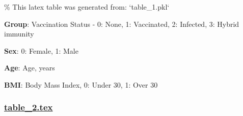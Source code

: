 \documentclass[11pt]{article}
\begin{document}
\begin{codeoutput}
\% This latex table was generated from: `table\_1.pkl`
\begin{table}[h]
\caption{Multiple regression analysis with the symptom number as the dependent variable}
\label{table:multiple\_regression}
\begin{threeparttable}
\renewcommand{\TPTminimum}{\linewidth}
\begin{tablenotes}
\footnotesize
\item \textbf{Group}: Vaccination Status - 0: None, 1: Vaccinated, 2: Infected, 3: Hybrid immunity
\item \textbf{Sex}: 0: Female, 1: Male
\item \textbf{Age}: Age, years
\item \textbf{BMI}: Body Mass Index, 0: Under 30, 1: Over 30
\end{tablenotes}
\end{threeparttable}
\end{table}
\end{codeoutput}

\subsubsection*{\hyperlink{code-LaTeX Table Design-table-2-tex}{table\_2.tex}}
\end{document}
